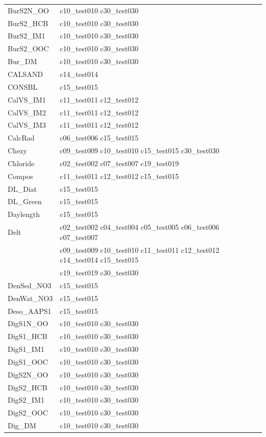 \begin{longtable}{ll}
BurS2N\_OO & c10\_test010 c30\_test030 \\
BurS2\_HCB & c10\_test010 c30\_test030 \\
BurS2\_IM1 & c10\_test010 c30\_test030 \\
BurS2\_OOC & c10\_test010 c30\_test030 \\
Bur\_DM & c10\_test010 c30\_test030 \\
CALSAND & c14\_test014 \\
CONSBL & c15\_test015 \\
CalVS\_IM1 & c11\_test011 c12\_test012 \\
CalVS\_IM2 & c11\_test011 c12\_test012 \\
CalVS\_IM3 & c11\_test011 c12\_test012 \\
CalcRad & c06\_test006 c15\_test015 \\
Chezy & c09\_test009 c10\_test010 c15\_test015 c30\_test030 \\
Chloride & c02\_test002 c07\_test007 c19\_test019 \\
Compos & c11\_test011 c12\_test012 c15\_test015 \\
DL\_Diat & c15\_test015 \\
DL\_Green & c15\_test015 \\
Daylength & c15\_test015 \\
Delt & c02\_test002 c04\_test004 c05\_test005 c06\_test006 c07\_test007 \\ 
 & c09\_test009 c10\_test010 c11\_test011 c12\_test012 c14\_test014 c15\_test015 \\ 
 & c19\_test019 c30\_test030 \\
DenSed\_NO3 & c15\_test015 \\
DenWat\_NO3 & c15\_test015 \\
Deso\_AAPS1 & c15\_test015 \\
DigS1N\_OO & c10\_test010 c30\_test030 \\
DigS1\_HCB & c10\_test010 c30\_test030 \\
DigS1\_IM1 & c10\_test010 c30\_test030 \\
DigS1\_OOC & c10\_test010 c30\_test030 \\
DigS2N\_OO & c10\_test010 c30\_test030 \\
DigS2\_HCB & c10\_test010 c30\_test030 \\
DigS2\_IM1 & c10\_test010 c30\_test030 \\
DigS2\_OOC & c10\_test010 c30\_test030 \\
Dig\_DM & c10\_test010 c30\_test030 \\

\end{longtable}
